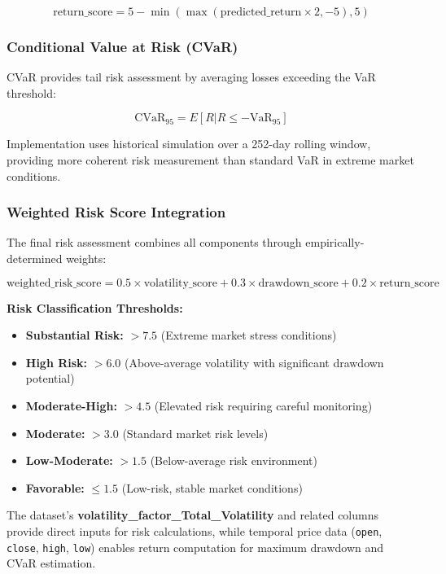 \documentclass[3p,times,procedia]{elsarticle}
\begin{document}
\begin{equation}
\text{return\_score} = 5 - \min(\max(\text{predicted\_return} \times 2, -5), 5)
\end{equation}

\subsubsection{{Conditional Value at Risk (CVaR)}}
CVaR provides tail risk assessment by averaging losses exceeding the VaR threshold:

\begin{equation}
\text{CVaR}_{95} = E[R | R \leq -\text{VaR}_{95}]
\end{equation}

Implementation uses historical simulation over a 252-day rolling window, providing more coherent risk measurement than standard VaR in extreme market conditions.

\subsubsection{{Weighted Risk Score Integration}}
The final risk assessment combines all components through empirically-determined weights:

\begin{equation}
\text{weighted\_risk\_score} = 0.5 \times \text{volatility\_score} + 0.3 \times \text{drawdown\_score} + 0.2 \times \text{return\_score}
\end{equation}

\textbf{Risk Classification Thresholds:}
\begin{itemize}
    \item \textbf{Substantial Risk:} $> 7.5$ (Extreme market stress conditions)
    \item \textbf{High Risk:} $> 6.0$ (Above-average volatility with significant drawdown potential)
    \item \textbf{Moderate-High:} $> 4.5$ (Elevated risk requiring careful monitoring)
    \item \textbf{Moderate:} $> 3.0$ (Standard market risk levels)
    \item \textbf{Low-Moderate:} $> 1.5$ (Below-average risk environment)
    \item \textbf{Favorable:} $\leq 1.5$ (Low-risk, stable market conditions)
\end{itemize} 
The dataset's \cite{FinReportDataset2025} \textbf{volatility\_factor\_Total\_Volatility} and related columns provide direct inputs for risk calculations, while temporal price data (\texttt{open}, \texttt{close}, \texttt{high}, \texttt{low}) enables return computation for maximum drawdown and CVaR estimation.
\end{document}
